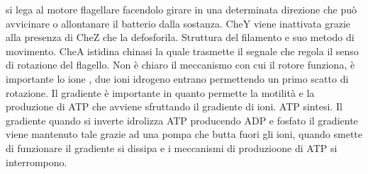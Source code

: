 si lega al motore flagellare facendolo girare in una determinata direzione che pu\`o avvicinare o allontanare il batterio dalla sostanza. CheY viene inattivata grazie alla presenza di 
CheZ che la defosforila. Struttura del filamento e suo metodo di movimento. CheA istidina chinasi la quale trasmette il segnale che regola il senso di rotazione del flagello. Non \`e 
chiaro il meccanismo con cui il rotore funziona, \`e importante lo ione , due ioni idrogeno entrano permettendo un primo scatto di rotazione. Il gradiente \`e importante in 
quanto permette la motilit\`a e la produzione di ATP che avviene sfruttando il gradiente di ioni. ATP sintesi. Il gradiente quando si inverte idrolizza ATP producendo ADP e fosfato il 
gradiente viene mantenuto tale grazie ad una pompa che butta fuori gli ioni, quando smette di funzionare il gradiente si dissipa e i meccanismi di produzioone di ATP si interrompono. 
